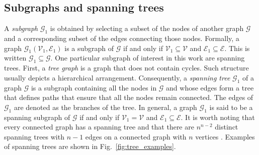 \subsection{Subgraphs and spanning trees}
A \emph{subgraph} $\mathcal{G}_1$ is obtained by selecting a subset of the nodes of another graph $\mathcal{G}$ and a corresponding subset of the edges connecting those nodes. Formally, a graph $\mathcal{G}_1\left(\mathcal{V}_1, \mathcal{E}_1\right)$ is a subgraph of $\mathcal{G}$ if and only if $\mathcal{V}_1 \subseteq  \mathcal{V}$ and $\mathcal{E}_1 \subseteq \mathcal{E}$. This is written $\mathcal{G}_1 \subseteq \mathcal{G}$. One particular subgraph of interest in this work are spanning trees. First, a \emph{tree graph} is a graph that does not contain cycles. Such structure usually depicts a hierarchical arrangement. Consequently, a \emph{spanning tree} $\mathcal{G}_1$ of a graph $\mathcal{G}$ is a subgraph containing all the nodes in $\mathcal{G}$ and whose edges form a tree that defines paths that ensure that all the nodes remain connected. The edges of $\mathcal{G}_1$ are denoted as the branches of the tree. In general, a graph $\mathcal{G}_1$ is said to be a spanning subgraph of $\mathcal{G}$ if and only if $\mathcal{V}_1 = \mathcal{V}$ and $\mathcal{E}_1 \subseteq \mathcal{E}$. It is worth noting that every connected graph has a spanning tree and that there are $n^{n-2}$ distinct spanning trees with $n - 1$ edges on a connected graph with $n$ vertices \cite{West2001Introductiongraphtheory}. Examples of spanning trees are shown in Fig.~\ref{fig:tree_examples}.

